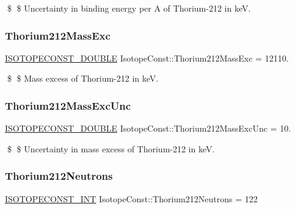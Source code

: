 \$ \$ Uncertainty in binding energy per A of Thorium-\/212 in keV. \mbox{\label{group___isotope_const-_thorium-_th212_gadc2634bf782ae4b71649eaacdd5e9699}} 
\subsubsection{\texorpdfstring{Thorium212\+Mass\+Exc}{Thorium212MassExc}}
{\footnotesize\ttfamily \mbox{\hyperlink{group___isotope_const-_macros_ga8f45a7272ce02c0b4c65c44636ed719a}{I\+S\+O\+T\+O\+P\+E\+C\+O\+N\+S\+T\+\_\+\+D\+O\+U\+B\+LE}} Isotope\+Const\+::\+Thorium212\+Mass\+Exc = 12110.}

\$ \$ Mass excess of Thorium-\/212 in keV. \mbox{\label{group___isotope_const-_thorium-_th212_ga60985a023d9648a3ff656536ceb52107}} 
\subsubsection{\texorpdfstring{Thorium212\+Mass\+Exc\+Unc}{Thorium212MassExcUnc}}
{\footnotesize\ttfamily \mbox{\hyperlink{group___isotope_const-_macros_ga8f45a7272ce02c0b4c65c44636ed719a}{I\+S\+O\+T\+O\+P\+E\+C\+O\+N\+S\+T\+\_\+\+D\+O\+U\+B\+LE}} Isotope\+Const\+::\+Thorium212\+Mass\+Exc\+Unc = 10.}

\$ \$ Uncertainty in mass excess of Thorium-\/212 in keV. \mbox{\label{group___isotope_const-_thorium-_th212_ga4dc81fd31cd92f9a22c70ffdca63a104}} 
\subsubsection{\texorpdfstring{Thorium212\+Neutrons}{Thorium212Neutrons}}
{\footnotesize\ttfamily \mbox{\hyperlink{group___isotope_const-_macros_ga5f18360b3e99483a35c32d789e62621c}{I\+S\+O\+T\+O\+P\+E\+C\+O\+N\+S\+T\+\_\+\+I\+NT}} Isotope\+Const\+::\+Thorium212\+Neutrons = 122}

